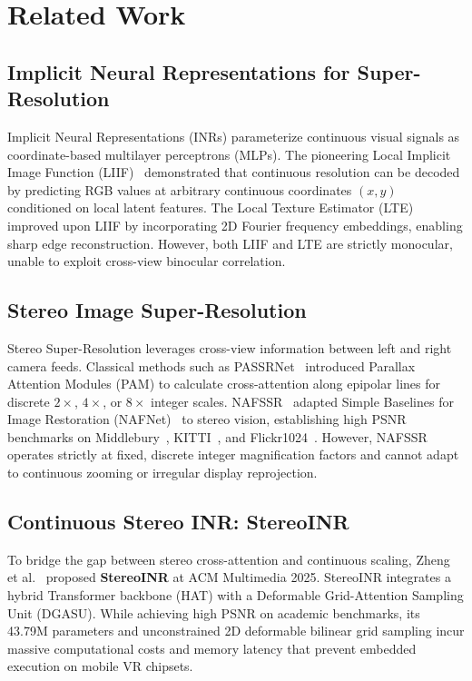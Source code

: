 \documentclass[conference]{IEEEtran}
\begin{document}
\section{Related Work}
\label{sec:related}

\subsection{Implicit Neural Representations for Super-Resolution}
Implicit Neural Representations (INRs) parameterize continuous visual signals as coordinate-based multilayer perceptrons (MLPs). The pioneering Local Implicit Image Function (LIIF)~\cite{chen2021liif} demonstrated that continuous resolution can be decoded by predicting RGB values at arbitrary continuous coordinates $(x, y)$ conditioned on local latent features. The Local Texture Estimator (LTE)~\cite{lee2022lte} improved upon LIIF by incorporating 2D Fourier frequency embeddings, enabling sharp edge reconstruction. However, both LIIF and LTE are strictly monocular, unable to exploit cross-view binocular correlation.

\subsection{Stereo Image Super-Resolution}
Stereo Super-Resolution leverages cross-view information between left and right camera feeds. Classical methods such as PASSRNet~\cite{wang2019passrnet} introduced Parallax Attention Modules (PAM) to calculate cross-attention along epipolar lines for discrete $2\times$, $4\times$, or $8\times$ integer scales. NAFSSR~\cite{chu2022nafsr} adapted Simple Baselines for Image Restoration (NAFNet)~\cite{chen2022nafnet} to stereo vision, establishing high PSNR benchmarks on Middlebury~\cite{scharstein2014middlebury}, KITTI~\cite{geiger2013kitti}, and Flickr1024~\cite{wang2019passrnet}. However, NAFSSR operates strictly at fixed, discrete integer magnification factors and cannot adapt to continuous zooming or irregular display reprojection.

\subsection{Continuous Stereo INR: StereoINR}
To bridge the gap between stereo cross-attention and continuous scaling, Zheng et al.~\cite{stereoinr2025} proposed \textbf{StereoINR} at ACM Multimedia 2025. StereoINR integrates a hybrid Transformer backbone (HAT) with a Deformable Grid-Attention Sampling Unit (DGASU). While achieving high PSNR on academic benchmarks, its 43.79M parameters and unconstrained 2D deformable bilinear grid sampling incur massive computational costs and memory latency that prevent embedded execution on mobile VR chipsets.
\end{document}
